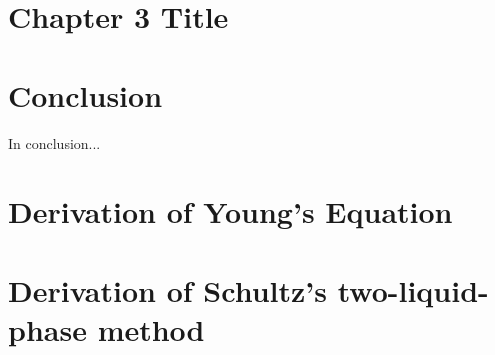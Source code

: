 \documentclass[12pt,letterpaper]{report}
\begin{document}



\chapter{Chapter 3 Title}


\chapter{Conclusion}
In conclusion...

\newpage
\appendix
\chapter{Derivation of Young's Equation}\label{appendixA}


\chapter{Derivation of Schultz's two-liquid-phase method}\label{appendixB}


\newpage


\end{document}
